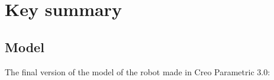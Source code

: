 \section{Key summary}

\subsection{Model}
The final version of the model of the robot made in Creo Parametric 3.0:
\begin{figure}[H]
	\begin{minipage}[h]{1\linewidth}
	\end{minipage}
\end{figure}
\begin{figure}[H]
	\begin{minipage}[h]{1\linewidth}
	\end{minipage}
\end{figure}
\newpage
